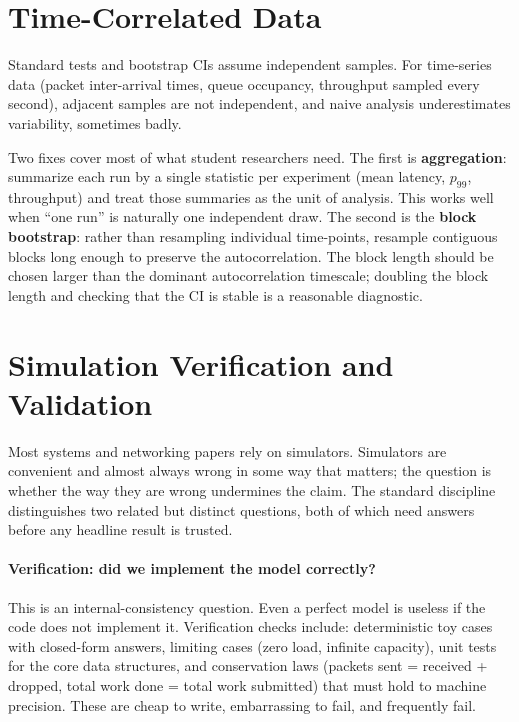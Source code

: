 \documentclass[11pt]{article}
\begin{document}
\section{Time-Correlated Data}
\label{sec:correlated}

Standard tests and bootstrap CIs assume independent samples. For time-series data (packet inter-arrival times, queue occupancy, throughput sampled every second), adjacent samples are not independent, and naive analysis underestimates variability, sometimes badly.

Two fixes cover most of what student researchers need. The first is \textbf{aggregation}: summarize each run by a single statistic per experiment (mean latency, $p_{99}$, throughput) and treat those summaries as the unit of analysis. This works well when ``one run'' is naturally one independent draw. The second is the \textbf{block bootstrap}: rather than resampling individual time-points, resample contiguous blocks long enough to preserve the autocorrelation. The block length should be chosen larger than the dominant autocorrelation timescale; doubling the block length and checking that the CI is stable is a reasonable diagnostic.

\section{Simulation Verification and Validation}
\label{sec:sim-validation}

Most systems and networking papers rely on simulators. Simulators are convenient and almost always wrong in some way that matters; the question is whether the way they are wrong undermines the claim. The standard discipline distinguishes two related but distinct questions, both of which need answers before any headline result is trusted.

\paragraph{Verification: did we implement the model correctly?} This is an internal-consistency question. Even a perfect model is useless if the code does not implement it. Verification checks include: deterministic toy cases with closed-form answers, limiting cases (zero load, infinite capacity), unit tests for the core data structures, and conservation laws (packets sent = received + dropped, total work done = total work submitted) that must hold to machine precision. These are cheap to write, embarrassing to fail, and frequently fail.
\end{document}
